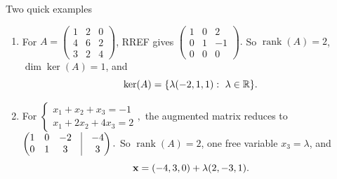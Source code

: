 \documentclass{beamer}
\DeclareMathOperator{\rank}{rank}
\begin{document}
\begin{frame}{Two quick examples}

\begin{enumerate}
\item For
\(
A=\begin{pmatrix}
1&2&0\\
4&6&2\\
3&2&4
\end{pmatrix}
\),
RREF gives
\(
\begin{pmatrix}
1&0&2\\
0&1&-1\\
0&0&0
\end{pmatrix}.
\)
So $\rank(A)=2$, $\dim\ker(A)=1$, and
\[
\ker(A)=\{\lambda(-2,1,1):\ \lambda\in\R\}.
\]

\item For
\(
\begin{cases}
x_1+x_2+x_3=-1\\
x_1+2x_2+4x_3=2
\end{cases},
\)
the augmented matrix reduces to
\(
\begin{pmatrix}
1&0&-2 &\vline& -4\\
0&1&3 &\vline& 3
\end{pmatrix}.
\)
So $\rank(A)=2$, one free variable $x_3=\lambda$, and
\[
{\bf x} = (-4,3,0) + \lambda(2,-3,1).
\]
\end{enumerate}

\end{frame}
\end{document}
